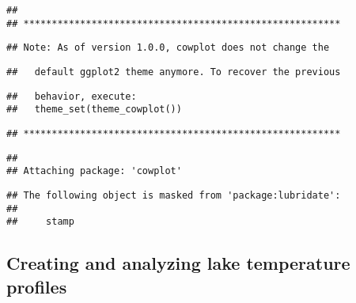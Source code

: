 \documentclass[]{article}
\newenvironment{Shaded}{\begin{snugshade}}{\end{snugshade}}
\newcommand{\KeywordTok}[1]{\textcolor[rgb]{0.13,0.29,0.53}{\textbf{#1}}}
\newcommand{\NormalTok}[1]{#1}
\newcommand{\OperatorTok}[1]{\textcolor[rgb]{0.81,0.36,0.00}{\textbf{#1}}}
\newcommand{\StringTok}[1]{\textcolor[rgb]{0.31,0.60,0.02}{#1}}
\begin{document}
\begin{verbatim}
## 
## ********************************************************
\end{verbatim}

\begin{verbatim}
## Note: As of version 1.0.0, cowplot does not change the
\end{verbatim}

\begin{verbatim}
##   default ggplot2 theme anymore. To recover the previous
\end{verbatim}

\begin{verbatim}
##   behavior, execute:
##   theme_set(theme_cowplot())
\end{verbatim}

\begin{verbatim}
## ********************************************************
\end{verbatim}

\begin{verbatim}
## 
## Attaching package: 'cowplot'
\end{verbatim}

\begin{verbatim}
## The following object is masked from 'package:lubridate':
## 
##     stamp
\end{verbatim}

\begin{Shaded}
\end{Shaded}

\hypertarget{creating-and-analyzing-lake-temperature-profiles}{%
\subsection{Creating and analyzing lake temperature
profiles}\label{creating-and-analyzing-lake-temperature-profiles}}
\end{document}
